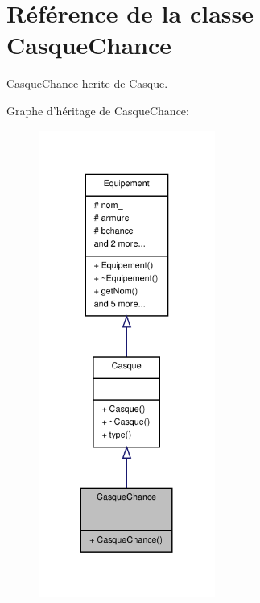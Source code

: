\hypertarget{class_casque_chance}{\section{Référence de la classe Casque\-Chance}
\label{class_casque_chance}
}


\hyperlink{class_casque_chance}{Casque\-Chance} herite de \hyperlink{class_casque}{Casque}.  




Graphe d'héritage de Casque\-Chance\-:
\nopagebreak
\begin{figure}[H]
\begin{center}
\leavevmode
\includegraphics[width=164pt]{class_casque_chance__inherit__graph}
\end{center}
\end{figure}


